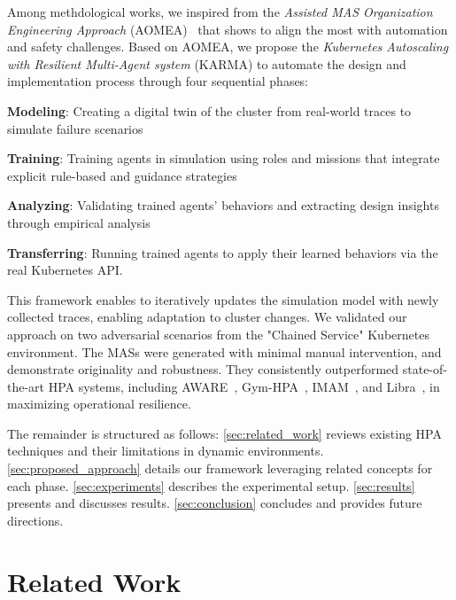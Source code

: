 \documentclass[conference]{IEEEtran}
\begin{document}
Among methdological works, we inspired from the \textit{Assisted MAS Organization Engineering Approach} (AOMEA)~\cite{soule2024aomea} that shows to align the most with automation and safety challenges. Based on AOMEA, we propose the \textit{Kubernetes Autoscaling with Resilient Multi-Agent system} (KARMA) to automate the design and implementation process through four sequential phases:
\begin{enumerate*}[label=\textbf{\arabic*)}, itemjoin={;\quad }]
    \item \textbf{Modeling}: Creating a digital twin of the cluster from real-world traces to simulate failure scenarios
    \item \textbf{Training}: Training agents in simulation using roles and missions that integrate explicit rule-based and guidance strategies
    \item \textbf{Analyzing}: Validating trained agents' behaviors and extracting design insights through empirical analysis
    \item \textbf{Transferring}: Running trained agents to apply their learned behaviors via the real Kubernetes API.
\end{enumerate*}

This framework enables to iteratively updates the simulation model with newly collected traces, enabling adaptation to cluster changes. We validated our approach on two adversarial scenarios from the "Chained Service" Kubernetes environment. The MASs were generated with minimal manual intervention, and demonstrate originality and robustness. They consistently outperformed state-of-the-art HPA systems, including AWARE~\cite{aware2023}, Gym-HPA~\cite{gymhpa2022}, IMAM~\cite{imam2022}, and Libra~\cite{Libra}, in maximizing operational resilience.

The remainder is structured as follows:
\autoref{sec:related_work} reviews existing HPA techniques and their limitations in dynamic environments.
\autoref{sec:proposed_approach} details our framework leveraging related concepts for each phase.
\autoref{sec:experiments} describes the experimental setup.
\autoref{sec:results} presents and discusses results.
\autoref{sec:conclusion} concludes and provides future directions.


\section{Related Work}
\label{sec:related_work}
\end{document}
